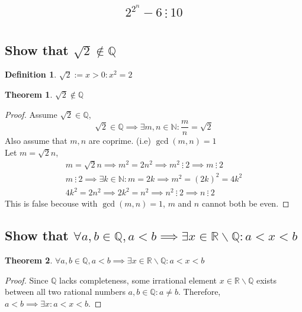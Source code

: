 \documentclass[]{article}
\newcommand{\R}{\mathbb{R}}
\newcommand{\N}{\mathbb{N}}
\newcommand{\Q}{\mathbb{Q}}
\newcommand{\divisible}{ \ \vdots \ }
\newtheorem{definition}{Definition}
\newtheorem{theorem}{Theorem}
\begin{document}
\subsection{
    $$2^{2^n} - 6 \divisible 10$$
}






\newpage
\section{}

\subsection{Show that $\sqrt{2} \notin \Q$}
\begin{definition}
    $\sqrt{2} := x > 0 : x^2 = 2$
\end{definition}
\begin{theorem}
    $\sqrt{2} \notin \Q$
\end{theorem}
\begin{proof}
    Assume $\sqrt{2} \in \Q$,
    $$\sqrt{2} \in \Q \implies \exists m,n \in \N : \frac{m}{n} = \sqrt{2}$$
    Also assume that $m,n$ are coprime. (i.e) $\gcd(m,n)=1$\\
    Let $m = \sqrt{2} n$,
    \begin{align*}
        m = \sqrt{2} n \implies m^2 = 2 n^2 \implies m^2 \divisible 2 \implies m \divisible 2\\
        m \divisible 2 \implies \exists k \in \N : m = 2k \implies m^2 = (2k)^2 = 4 k^2\\
        4k^2 = 2 n^2 \implies 2k^2 = n^2 \implies n^2 \divisible 2 \implies n \divisible 2
    \end{align*}
    This is false becouse with $\gcd(m,n)=1$, $m$ and $n$ cannot both be even.
\end{proof}

\subsection{Show that 
    $\forall a,b \in \Q, a < b \implies \exists x \in \R \backslash \Q : a < x < b$
}
\begin{theorem}
    $\forall a,b \in \Q, a < b \implies \exists x \in \R \backslash \Q : a < x < b$
\end{theorem}
\begin{proof}
    Since $\Q$ lacks completeness, some irrational element $x \in \R \backslash \Q$ 
    exists between all two rational numbers $a,b\in \Q : a \neq b$. 
    Therefore, $a < b \implies \exists x : a < x < b$.
\end{proof}
\end{document}

